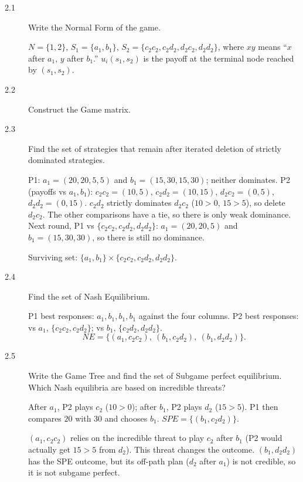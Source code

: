 \begin{description}
\item[2.1] Write the Normal Form of the game.
\begin{solution}
$N=\{1,2\}$, $S_1=\{a_1,b_1\}$, $S_2=\{c_2c_2,c_2d_2,d_2c_2,d_2d_2\}$, where $xy$ means ``$x$ after $a_1$, $y$ after $b_1$.'' $u_i(s_1,s_2)$ is the payoff at the terminal node reached by $(s_1,s_2)$.
\end{solution}
\item[2.2] Construct the Game matrix.
\begin{solution}
\end{solution}
\item[2.3] Find the set of strategies that remain after iterated deletion of strictly dominated strategies.
\begin{solution}
P1: $a_1=(20,20,5,5)$ and $b_1=(15,30,15,30)$; neither dominates. P2 (payoffs vs $a_1,b_1$): $c_2c_2=(10,5)$, $c_2d_2=(10,15)$, $d_2c_2=(0,5)$, $d_2d_2=(0,15)$. $c_2d_2$ strictly dominates $d_2c_2$ ($10>0$, $15>5$), so delete $d_2c_2$. The other comparisons have a tie, so there is only weak dominance. Next round, P1 vs $\{c_2c_2,c_2d_2,d_2d_2\}$: $a_1=(20,20,5)$ and $b_1=(15,30,30)$, so there is still no dominance.

Surviving set: $\{a_1,b_1\}\times\{c_2c_2,c_2d_2,d_2d_2\}$.
\end{solution}
\item[2.4] Find the set of Nash Equilibrium.
\begin{solution}
P1 best responses: $a_1,b_1,b_1,b_1$ against the four columns. P2 best responses: vs $a_1$, $\{c_2c_2,c_2d_2\}$; vs $b_1$, $\{c_2d_2,d_2d_2\}$.
\[NE=\{(a_1,c_2c_2),\ (b_1,c_2d_2),\ (b_1,d_2d_2)\}.\]
\end{solution}
\item[2.5] Write the Game Tree and find the set of Subgame perfect equilibrium. Which Nash equilibria are based on incredible threats?
\begin{solution}
After $a_1$, P2 plays $c_2$ ($10>0$); after $b_1$, P2 plays $d_2$ ($15>5$). P1 then compares $20$ with $30$ and chooses $b_1$. $SPE=\{(b_1,c_2d_2)\}$.

$(a_1,c_2c_2)$ relies on the incredible threat to play $c_2$ after $b_1$ (P2 would actually get $15>5$ from $d_2$). This threat changes the outcome. $(b_1,d_2d_2)$ has the SPE outcome, but its off-path plan ($d_2$ after $a_1$) is not credible, so it is not subgame perfect.
\end{solution}
\end{description}

